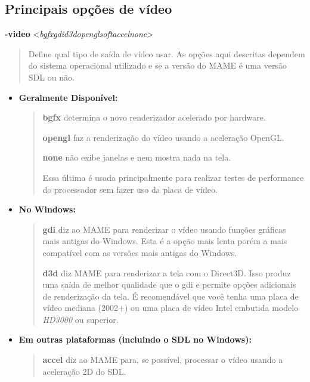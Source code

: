 \documentclass[letterpaper,10pt,brazil]{sphinxmanual}
\begin{document}
\subsection{Principais opções de vídeo}
\label{commandline/commandline-all:principais-opcoes-de-video}\label{commandline/commandline-all:mame-commandline-video}
\textbf{-video} \textless{}\emph{bgfx\textbar{}gdi\textbar{}d3d\textbar{}opengl\textbar{}soft\textbar{}accel\textbar{}none}\textgreater{}
\begin{quote}

Define qual tipo de saída de vídeo usar. As opções aqui descritas
dependem do sistema operacional utilizado e se a versão do MAME é
uma versão SDL ou não.
\end{quote}
\begin{itemize}
\item {} 
\textbf{Geralmente Disponível:}
\begin{quote}

\textbf{bgfx} determina o novo renderizador acelerado por hardware.

\textbf{opengl} faz a renderização do vídeo usando a aceleração OpenGL.

\textbf{none} não exibe janelas e nem mostra nada na tela.

Essa última é usada principalmente para realizar testes de
performance do processador sem fazer uso da placa de vídeo.
\end{quote}

\item {} 
\textbf{No Windows:}
\begin{quote}

\textbf{gdi} diz ao MAME para renderizar o vídeo usando funções gráficas mais
antigas do Windows. Esta é a opção mais lenta porém a mais compatível
com as versões mais antigas do Windows.

\textbf{d3d} diz MAME para renderizar a tela com o Direct3D.
Isso produz uma saída de melhor qualidade que o gdi e permite opções
adicionais de renderização da tela. É recomendável que você tenha uma
placa de vídeo mediana (2002+) ou uma placa de vídeo Intel embutida
modelo \emph{HD3000} ou superior.
\end{quote}

\item {} 
\textbf{Em outras plataformas (incluindo o SDL no Windows):}
\begin{quote}

\textbf{accel} diz ao MAME para, se possível, processar o vídeo usando a
aceleração 2D do SDL.


\end{quote}
\end{itemize}
\end{document}
